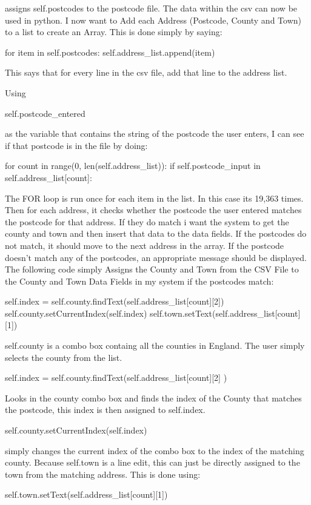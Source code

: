    assigns self.postcodes to the postcode file. The data within the csv can now be used in python. I now want to Add each Address (Postcode, County and Town) to a list to create an Array. This is done simply by saying:

\begin{python}
 for item in self.postcodes:
 	self.address_list.append(item)
\end{python}

This says that for every line in the csv file, add that line to the address list.

  Using 
  
\begin{python}
self.postcode_entered
\end{python} 

as the variable that contains the string of the postcode the user enters, I can see if that postcode is in the file by doing:

\begin{python}
for count in range(0, len(self.address_list)):
	 if self.postcode_input in self.address_list[count]:
\end{python}

The FOR loop is run once for each item in the list. In this case its 19,363 times. Then for each address, it checks whether the postcode the user entered matches the postcode for that address. If they do match i want the system to get the county and town and then insert that data to the data fields. If the postcodes do not match, it should move to the next address in the array. If the postcode doesn't match any of the postcodes, an appropriate message should be displayed. The following code simply Assigns the County and Town from the CSV File to the County and Town Data Fields in my system if the postcodes match:

\begin{python}
self.index = self.county.findText(self.address_list[count][2])
self.county.setCurrentIndex(self.index)
self.town.setText(self.address_list[count][1])
\end{python}

self.county is a combo box containg all the counties in England. The user simply selects the county from the list.
 \begin{python}
 self.index = self.county.findText(self.address_list[count][2]
 )\end{python}
 
 Looks in the county combo box and finds the index of the County that matches the postcode, this index is then assigned to self.index.
\begin{python} 
 self.county.setCurrentIndex(self.index)
  \end{python}
simply changes the current index of the combo box to the index of the matching county. Because self.town is a line edit, this can just be directly assigned to the town from the matching address. This is done using:
\begin{python}
self.town.setText(self.address_list[count][1])
\end{python}

